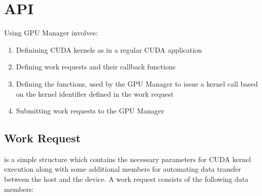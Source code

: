 \documentclass[10pt]{report}
\begin{document}
\section{API}

Using GPU Manager involves:
\begin{enumerate}
\item Definining CUDA kernels as in a regular CUDA application
\item Defining work requests and their callback functions
\item Defining the  functions, used by the GPU Manager to issue a kernel call based on the kernel identifier defined in the work request
\item Submitting work requests to the GPU Manager
\end{enumerate}

\subsection{Work Request}
 is a simple structure which contains the necessary parameters
for CUDA kernel execution along with some additional members for automating
data transfer between the host and the device.
A work request consists of the following data members:
\end{document}
